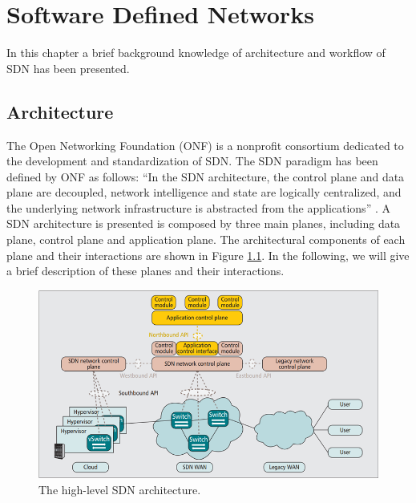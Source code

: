 \chapter{Software Defined Networks} \label{sec:SDN_BGK}
In this chapter a brief background knowledge of architecture and workflow of SDN has been presented.

\section{Architecture}
The Open Networking Foundation (ONF) \cite{ONF} is a nonprofit consortium dedicated to the development and standardization of SDN. The SDN paradigm has been defined by ONF as follows: “In the SDN architecture, the control plane and data plane are decoupled, network intelligence and state are logically centralized, and the underlying network infrastructure is abstracted from the applications” \cite{Sezer2013}.
A SDN architecture is presented is composed by three main planes, including data plane, control plane and application plane. The architectural components of each plane and their interactions are shown in Figure \ref{fig:{ONF}}. In the following, we will give a brief description of these planes and their interactions.
\begin{figure}[tb!]
	\centering
	\includegraphics[width=13cm]{figure/ONF.png}
	\caption{The high-level SDN architecture.}
	\label{fig:{ONF}}
\end{figure}
